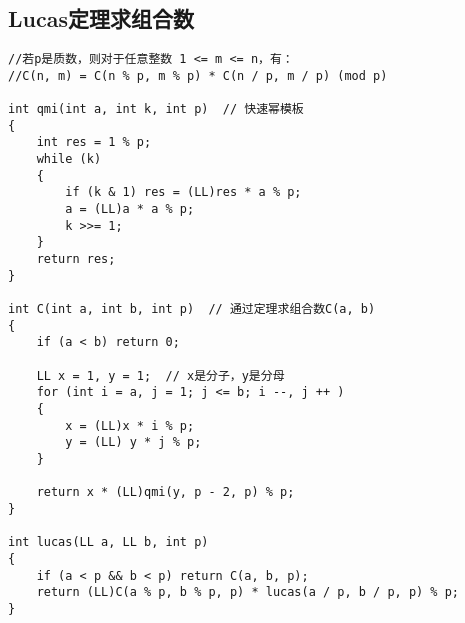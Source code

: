 \documentclass[12pt,a4paper,UTF16]{ctexbook}
\theoremstyle{plain}
\begin{document}
\subsection{Lucas定理求组合数}
\begin{lstlisting}
//若p是质数，则对于任意整数 1 <= m <= n，有：
//C(n, m) = C(n % p, m % p) * C(n / p, m / p) (mod p)

int qmi(int a, int k, int p)  // 快速幂模板
{
    int res = 1 % p;
    while (k)
    {
        if (k & 1) res = (LL)res * a % p;
        a = (LL)a * a % p;
        k >>= 1;
    }
    return res;
}

int C(int a, int b, int p)  // 通过定理求组合数C(a, b)
{
    if (a < b) return 0;

    LL x = 1, y = 1;  // x是分子，y是分母
    for (int i = a, j = 1; j <= b; i --, j ++ )
    {
        x = (LL)x * i % p;
        y = (LL) y * j % p;
    }

    return x * (LL)qmi(y, p - 2, p) % p;
}

int lucas(LL a, LL b, int p)
{
    if (a < p && b < p) return C(a, b, p);
    return (LL)C(a % p, b % p, p) * lucas(a / p, b / p, p) % p;
}
\end{lstlisting}
\end{document}
